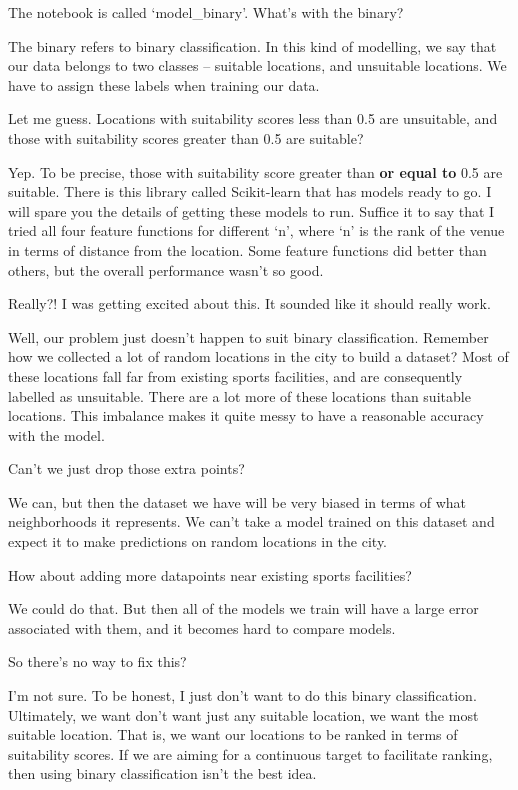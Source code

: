{\color{blue} The notebook is called `model\_binary'. What's with the binary?}

The binary refers to binary classification. In this kind of modelling, we say that our data belongs to two classes -- suitable locations, and unsuitable locations. We have to assign these labels when training our data. 

{\color{blue} Let me guess. Locations with suitability scores less than 0.5 are unsuitable, and those with suitability scores greater than 0.5 are suitable?}

Yep. To be precise, those with suitability score greater than \textbf{or equal to} 0.5 are suitable. There is this library called Scikit-learn that has models ready to go. I will spare you the details of getting these models to run. Suffice it to say that I tried all four feature functions for different `n', where `n' is the rank of the venue in terms of distance from the location. Some feature functions did better than others, but the overall performance wasn't so good.

{\color{blue} Really?! I was getting excited about this. It sounded like it should really work.}

Well, our problem just doesn't happen to suit binary classification. Remember how we collected a lot of random locations in the city to build a dataset? Most of these locations fall far from existing sports facilities, and are consequently labelled as unsuitable. There are a lot more of these locations than suitable locations. This imbalance makes it quite messy to have a reasonable accuracy with the model. 

{\color{blue} Can't we just drop those extra points?}

We can, but then the dataset we have will be very biased in terms of what neighborhoods it represents. We can't take a model trained on this dataset and expect it to make predictions on random locations in the city. 

{\color{blue} How about adding more datapoints near existing sports facilities?}

We could do that. But then all of the models we train will have a large error associated with them, and it becomes hard to compare models. 

{\color{blue} So there's no way to fix this?}

I'm not sure. To be honest, I just don't want to do this binary classification. Ultimately, we want don't want just any suitable location, we want the most suitable location. That is, we want our locations to be ranked in terms of suitability scores. If we are aiming for a continuous target to facilitate ranking, then using binary classification isn't the best idea. 

